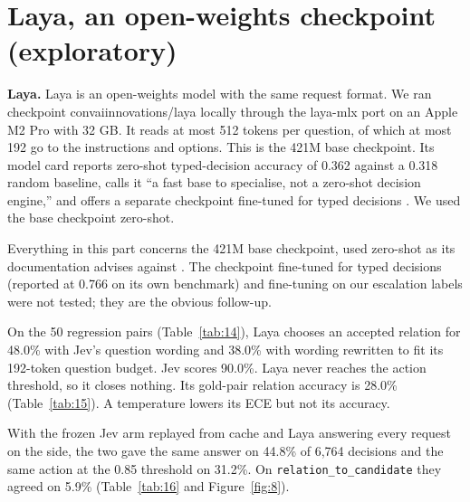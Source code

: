 \documentclass[11pt]{article}
\newcommand{\src}[1]{}
\begin{document}
\section{Laya, an open-weights checkpoint (exploratory)}\label{app:D}
\textbf{Laya.} Laya is an open-weights model with the same request format. We ran checkpoint convaiinnovations/laya\src{bench/results/e4\_belief\_v2\_laya\_\_dev\_updates\_\_k3.json} locally through the laya-mlx port on an Apple M2 Pro\src{bench/results/e4\_belief\_v2\_laya\_\_dev\_updates\_\_k3.json} with 32\src{bench/results/e4\_belief\_v2\_laya\_\_dev\_updates\_\_k3.json} GB. It reads at most 512\src{bench/results/e4\_belief\_v2\_laya\_\_dev\_updates\_\_k3.json} tokens per question, of which at most 192\src{bench/results/e4\_belief\_v2\_laya\_\_dev\_updates\_\_k3.json} go to the instructions and options. This is the 421M\src{convai2026laya (model card)} base checkpoint. Its model card reports zero-shot typed-decision accuracy of 0.362\src{convai2026laya (base checkpoint, typed-decisions, zero-shot)} against a 0.318\src{convai2026laya (random baseline)} random baseline, calls it ``a fast base to specialise, not a zero-shot decision engine,'' and offers a separate checkpoint fine-tuned for typed decisions \citep{convai2026laya}. We used the base checkpoint zero-shot.

Everything in this part concerns the 421M\src{convai2026laya (model card)} base checkpoint, used zero-shot as its documentation advises against \citep{convai2026laya}. The checkpoint fine-tuned for typed decisions (reported at 0.766\src{convai2026laya (laya-typed-decisions, fine-tuned)} on its own benchmark) and fine-tuning on our escalation labels were not tested; they are the obvious follow-up.

On the 50\src{bench/results/tradeoff.json} regression pairs (Table~\ref{tab:14}), Laya chooses an accepted relation for 48.0\%\src{bench/results/laya\_regression\_jev\_wording.json} with Jev's question wording and 38.0\%\src{bench/results/laya\_regression\_native.json} with wording rewritten to fit its 192\src{bench/results/e4\_belief\_v2\_laya\_\_dev\_updates\_\_k3.json}-token question budget. Jev scores 90.0\%\src{bench/results/jev\_regression\_v2.json}. Laya never reaches the action threshold, so it closes nothing. Its gold-pair relation accuracy is 28.0\%\src{bench/results/calibration.json} (Table~\ref{tab:15}). A temperature lowers its ECE but not its accuracy.

With the frozen Jev arm replayed from cache and Laya answering every request on the side, the two gave the same answer on 44.8\%\src{bench/results/laya\_agreement.json} of 6,764\src{bench/results/laya\_agreement.json} decisions and the same action at the 0.85\src{src/engram/config.py} threshold on 31.2\%\src{bench/results/laya\_agreement.json}. On \texttt{relation\_\allowbreak{}to\_\allowbreak{}candidate} they agreed on 5.9\%\src{bench/results/laya\_agreement.json} (Table~\ref{tab:16} and Figure~\ref{fig:8}).
\end{document}
